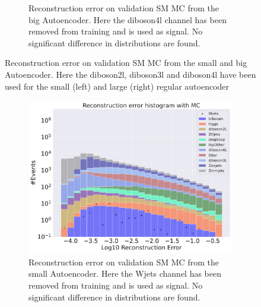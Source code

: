 \begin{figure}[H]
\begin{subfigure}{.45\textwidth}
        \caption{Reconstruction error on validation SM MC from the big Autoencoder. Here the diboson4l channel has been removed from training and 
        is used as signal. No significant difference in distributions are found. }
        \label{fig:ae_big_diboson4l}
    \end{subfigure}
    \hfill  
    \caption[AE | Channel removal, diboson2l, diboson3l, diboson4l]{Reconstruction error on validation SM MC from the small and big Autoencoder. Here the diboson2l, diboson3l and diboson4l have been used for the
    small (left) and large (right) regular autoencoder}
    \label{fig:ae_big_channel3}
\end{figure}


\begin{figure}[H]
    \centering
    \begin{subfigure}{.45\textwidth}
        \includegraphics[width=\textwidth]{Figures/AE_testing/small/b_data_recon_big_rm3_feats_sig_Wjets.pdf}
        \caption{Reconstruction error on validation SM MC from the small Autoencoder. Here the Wjets channel has been removed from training and 
        is used as signal. No significant difference in distributions are found.}
        \label{fig:ae_small_Wjets}
    \end{subfigure}
    \hfill 
    \begin{subfigure}{.45\textwidth}

\end{subfigure}
\end{figure}
